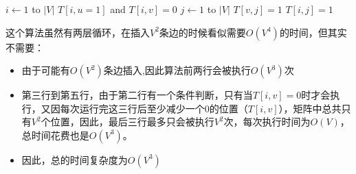 \documentclass{article}
\begin{document}
\begin{CJK}{UTF8}{gbsn}
\begin{codebox}
\li \For $i \gets 1$ to $|V|$
\li 	\Do \If $T[i,u = 1]$ and $T[i,v] = 0$
\li 			\Then \For $j \gets 1$ to $|V|$
\li						\Do \If $T[v,j] = 1$
\li 							\Then $T[i,j] = 1$
								\End
						\End
				\End
		\End
\end{codebox}

这个算法虽然有两层循环，在插入$V^2$条边的时候看似需要$O(V^4)$的时间，但其实不需要：
\begin{itemize}
  \item 由于可能有$O(V^2)$条边插入,因此算法前两行会被执行$O(V^3)$次
  \item
  第三行到第五行，由于第二行有一个条件判断，只有当$T[i,v]=0$时才会执行，又因每次运行完这三行后至少减少一个0的位置（$T[i,v]$），矩阵中总共只有$V^2$个位置，因此，最后三行最多只会被执行$V^2$次，每次执行时间为$O(V)$，总时间花费也是$O(V^3)$。
  \item 因此，总的时间复杂度为$O(V^3)$
\end{itemize}
\end{CJK}
\end{document}
